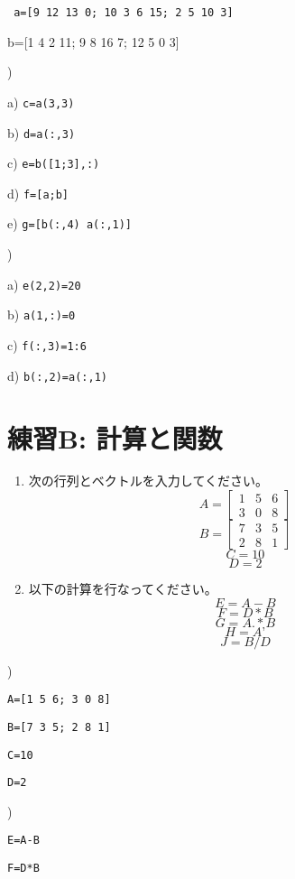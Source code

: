 \documentclass{jsarticle}
\begin{document}
{\tt
a=[9 12 13 0; 10 3 6 15; 2 5 10 3]

b=[1 4 2 11; 9 8 16 7; 12 5 0 3]
}

\bigskip

)

a) {\tt c=a(3,3)}

b) {\tt d=a(:,3)}

c) {\tt e=b([1;3],:)}

d) {\tt f=[a;b]}

e) {\tt g=[b(:,4) a(:,1)]}

\bigskip

)

a) {\tt e(2,2)=20}

b) {\tt a(1,:)=0}

c) {\tt f(:,3)=1:6}

d) {\tt b(:,2)=a(:,1)}

\section{練習B: 計算と関数}

\begin{boxnote}
\begin{enumerate}
  \item 次の行列とベクトルを入力してください。
\[
  A = \left[
    \begin{array}{ccc}
      1 & 5 & 6 \\
      3 & 0 & 8
    \end{array}
  \right]
\]
\[
  B = \left[
    \begin{array}{ccc}
      7 & 3 & 5 \\
      2 & 8 & 1
    \end{array}
  \right]
\]
\[ C = 10 \]
\[ D = 2 \]

\item 以下の計算を行なってください。
\[E = A-B\]
\[F = D*B\]
\[G = A.*B\]
\[H = A’\]
\[J = B/D\]
\end{enumerate}
\end{boxnote}

)

{\tt A=[1 5 6; 3 0 8]}

{\tt B=[7 3 5; 2 8 1]}

{\tt C=10}

{\tt D=2}

\bigskip

)

{\tt E=A-B}

{\tt F=D*B}
\end{document}
